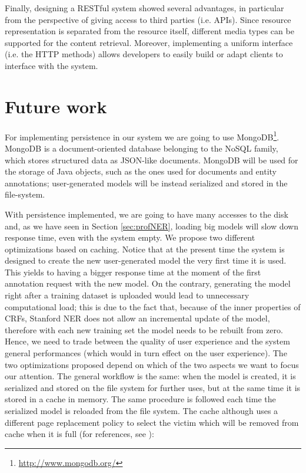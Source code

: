 \documentclass[a4paper,11pt]{report}
\begin{document}
Finally, designing a RESTful system showed several advantages, in particular from the perspective of giving access to third parties (i.e. APIs). Since resource representation is separated from the resource itself, different media types can be supported for the content retrieval. Moreover, implementing a uniform interface (i.e. the HTTP methods) allows developers to easily build or adapt clients to interface with the system.

\section{Future work}
For implementing persistence in our system we are going to use MongoDB\footnote{\url{http://www.mongodb.org/}}.
MongoDB is a document-oriented database belonging to the NoSQL family, which stores structured data as JSON-like documents. MongoDB will be used for the storage of Java objects, such as the ones used for documents and entity annotations; user-generated models will be instead serialized and stored in the file-system.

With persistence implemented, we are going to have many accesses to the disk and, as we have seen in Section \ref{sec:profNER}, loading big models will slow down response time, even with the system empty. We propose two different optimizations based on caching. Notice that at the present time the system is designed to create the new user-generated model the very first time it is used. This yields to having a bigger response time at the moment of the first annotation request with the new model. On the contrary, generating the model right after a training dataset is uploaded would lead to unnecessary computational load; this is due to the fact that, because of the inner properties of CRFs, Stanford NER does not allow an incremental update of the model, therefore with each new training set the model needs to be rebuilt from zero. Hence, we need to trade between the quality of user experience and the system general performances (which would in turn effect on the user experience).
The two optimizations proposed depend on which of the two aspects we want to focus our attention. The general workflow is the same: when the model is created, it is serialized and stored on the file system for further uses, but at the same time it is stored in a cache in memory. The same procedure is followed each time the serialized model is reloaded from the file system. The cache although uses a different page replacement policy to select the victim which will be removed from cache when it is full (for references, see \citet{silberOS}):
\end{document}
